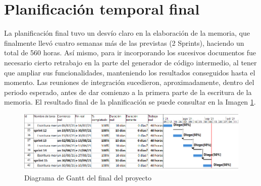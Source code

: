 \section{Planificación temporal final}

La planificación final tuvo un desvío claro en la elaboración de la memoria, que finalmente llevó cuatro semanas más de las previstas (2 Sprints), haciendo un total de 560 horas. Así mismo, para ir incorporando los sucesivos documentos fue necesario cierto retrabajo en la parte del generador de código intermedio, al tener que ampliar sus funcionalidades, manteniendo los resultados conseguidos hasta el momento. Las reuniones de integración sucedieron, aproximadamente, dentro del periodo esperado, antes de dar comienzo a la primera parte de la escritura de la memoria. El resultado final de la planificación se puede consultar en la Imagen \ref{fig:gantt-final}.

\begin{figure}[hp!]
	\centering
	\includegraphics[angle=0,width=1.0\textwidth]{imaxes/f-planificacion/gantt-final}
	\caption{Diagrama de Gantt del final del proyecto}
	\label{fig:gantt-final}
\end{figure}
